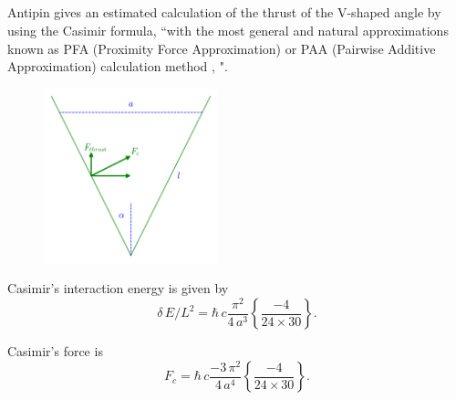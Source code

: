 \documentclass[twoside, 10pt]{article}
\def\myvspacebeforesubsection{-2.0mm}
\def\myvspaceaftersubsection{-2.5mm}
\begin{document}
\begin{multicols}{2}

\vspace{\myvspacebeforesubsection}
    \subsection*{} \label{appendix-d.-the-derivation-of-the-thrust-formula-for-the-honeycomb-basing-on-the-antipin-formula-for-the-thrust-of-a-metal-angle}
\vspace{\myvspaceaftersubsection}

\setcounter{equation}{0}
\renewcommand{\theequation}{D.\arabic{equation}}

    Antipin \cite{Antipin2012} gives an estimated calculation of the thrust
of the  \mbox{V-shaped} angle by using the Casimir formula, ``with the most
general and natural approximations known as PFA (Proximity Force
Approximation) or PAA (Pairwise Additive Approximation) calculation
method \cite{Intravaia2013}, \cite{Rodriguez2011}".

\begin{figure}
\begin{center}
\includegraphics[width=0.45\textwidth]{Antipins_angle_en.png}
\caption{}{}
\end{center}
\label{fig:Antipins_angle}
\end{figure}


Casimir's interaction energy is given by
\noindent
\begin{equation}\delta\,E/L^2 = \hbar\,c\frac{\pi^2}{4\,a^3}\left\{\frac{-4}{24\times30}\right\}.\end{equation}

Casimir's force is
\noindent
\begin{equation}F_{c} = \hbar\,c\frac{-3\,\pi^2}{4\,a^4}\left\{\frac{-4}{24\times30}\right\}.\end{equation}


\end{multicols}
\end{document}
